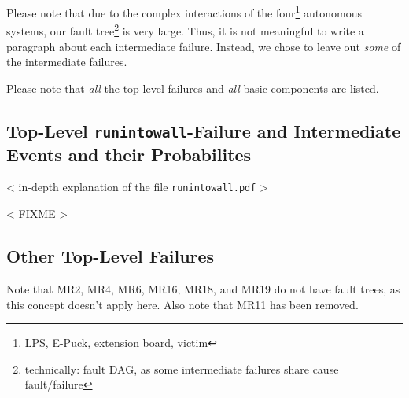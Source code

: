 \documentclass[a4paper,parskip,headheight=38pt]{scrartcl} %
\newcommand{\incomplete}[1]{\textless{} #1 \textgreater{}}
\begin{document}
Please note that due to the complex interactions of the
four\footnote{LPS, E-Puck, extension board, victim} autonomous systems,
our fault tree\footnote{technically: fault DAG, as some intermediate
failures share cause fault/failure} is very large.  Thus, it is not
meaningful to write a paragraph about each intermediate failure.
Instead, we chose to leave out \emph{some} of the intermediate
failures.

Please note that \emph{all} the top-level failures and \emph{all} basic
components are listed.

\subsection*{Top-Level \texttt{runintowall}-Failure and Intermediate Events and their Probabilites}

\incomplete{in-depth explanation of the file \texttt{runintowall.pdf}}

\incomplete{FIXME}


\subsection*{Other Top-Level Failures}

Note that MR2, MR4, MR6, MR16, MR18, and MR19 do
not have fault trees, as this concept doesn't apply here.  Also note
that MR11 has been removed.
\end{document}

